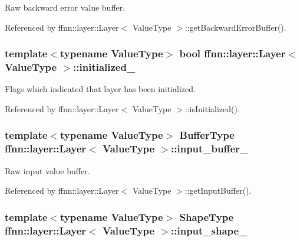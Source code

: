 Raw backward error value buffer. 



Referenced by ffnn\-::layer\-::\-Layer$<$ Value\-Type $>$\-::get\-Backward\-Error\-Buffer().

\hypertarget{classffnn_1_1layer_1_1_layer_a4e353c2498ffed566076b3a7fd187e7b}{
\subsubsection[{initialized\-\_\-}]{\setlength{\rightskip}{0pt plus 5cm}template$<$typename Value\-Type$>$ bool {\bf ffnn\-::layer\-::\-Layer}$<$ Value\-Type $>$\-::initialized\-\_\-\hspace{0.3cm}{\ttfamily [protected]}}}\label{classffnn_1_1layer_1_1_layer_a4e353c2498ffed566076b3a7fd187e7b}


Flags which indicated that layer has been initialized. 



Referenced by ffnn\-::layer\-::\-Layer$<$ Value\-Type $>$\-::is\-Initialized().

\hypertarget{classffnn_1_1layer_1_1_layer_ad4b5ac0708d6ada04d62df4fad377f1a}{
\subsubsection[{input\-\_\-buffer\-\_\-}]{\setlength{\rightskip}{0pt plus 5cm}template$<$typename Value\-Type$>$ {\bf Buffer\-Type} {\bf ffnn\-::layer\-::\-Layer}$<$ Value\-Type $>$\-::input\-\_\-buffer\-\_\-\hspace{0.3cm}{\ttfamily [protected]}}}\label{classffnn_1_1layer_1_1_layer_ad4b5ac0708d6ada04d62df4fad377f1a}


Raw input value buffer. 



Referenced by ffnn\-::layer\-::\-Layer$<$ Value\-Type $>$\-::get\-Input\-Buffer().

\hypertarget{classffnn_1_1layer_1_1_layer_a07cc49b6890743a8045e3adc7c07aca5}{
\subsubsection[{input\-\_\-shape\-\_\-}]{\setlength{\rightskip}{0pt plus 5cm}template$<$typename Value\-Type$>$ {\bf Shape\-Type} {\bf ffnn\-::layer\-::\-Layer}$<$ Value\-Type $>$\-::input\-\_\-shape\-\_\-\hspace{0.3cm}{\ttfamily [protected]}}}\label{classffnn_1_1layer_1_1_layer_a07cc49b6890743a8045e3adc7c07aca5}


